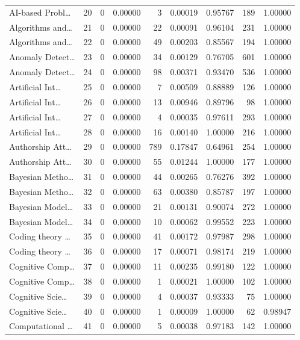 \begin{table}
\begin{tabular}{lrrrrrrrr}
AI-based Probl… & 20 & 0 & 0.00000 & 3 & 0.00019 & 0.95767 & 189 & 1.00000 \\
Algorithms and… & 21 & 0 & 0.00000 & 22 & 0.00091 & 0.96104 & 231 & 1.00000 \\
Algorithms and… & 22 & 0 & 0.00000 & 49 & 0.00203 & 0.85567 & 194 & 1.00000 \\
Anomaly Detect… & 23 & 0 & 0.00000 & 34 & 0.00129 & 0.76705 & 601 & 1.00000 \\
Anomaly Detect… & 24 & 0 & 0.00000 & 98 & 0.00371 & 0.93470 & 536 & 1.00000 \\
Artificial Int… & 25 & 0 & 0.00000 & 7 & 0.00509 & 0.88889 & 126 & 1.00000 \\
Artificial Int… & 26 & 0 & 0.00000 & 13 & 0.00946 & 0.89796 & 98 & 1.00000 \\
Artificial Int… & 27 & 0 & 0.00000 & 4 & 0.00035 & 0.97611 & 293 & 1.00000 \\
Artificial Int… & 28 & 0 & 0.00000 & 16 & 0.00140 & 1.00000 & 216 & 1.00000 \\
Authorship Att… & 29 & 0 & 0.00000 & 789 & 0.17847 & 0.64961 & 254 & 1.00000 \\
Authorship Att… & 30 & 0 & 0.00000 & 55 & 0.01244 & 1.00000 & 177 & 1.00000 \\
Bayesian Metho… & 31 & 0 & 0.00000 & 44 & 0.00265 & 0.76276 & 392 & 1.00000 \\
Bayesian Metho… & 32 & 0 & 0.00000 & 63 & 0.00380 & 0.85787 & 197 & 1.00000 \\
Bayesian Model… & 33 & 0 & 0.00000 & 21 & 0.00131 & 0.90074 & 272 & 1.00000 \\
Bayesian Model… & 34 & 0 & 0.00000 & 10 & 0.00062 & 0.99552 & 223 & 1.00000 \\
Coding theory … & 35 & 0 & 0.00000 & 41 & 0.00172 & 0.97987 & 298 & 1.00000 \\
Coding theory … & 36 & 0 & 0.00000 & 17 & 0.00071 & 0.98174 & 219 & 1.00000 \\
Cognitive Comp… & 37 & 0 & 0.00000 & 11 & 0.00235 & 0.99180 & 122 & 1.00000 \\
Cognitive Comp… & 38 & 0 & 0.00000 & 1 & 0.00021 & 1.00000 & 102 & 1.00000 \\
Cognitive Scie… & 39 & 0 & 0.00000 & 4 & 0.00037 & 0.93333 & 75 & 1.00000 \\
Cognitive Scie… & 40 & 0 & 0.00000 & 1 & 0.00009 & 1.00000 & 62 & 0.98947 \\
Computational … & 41 & 0 & 0.00000 & 5 & 0.00038 & 0.97183 & 142 & 1.00000 \\

\end{tabular}
\end{table}
